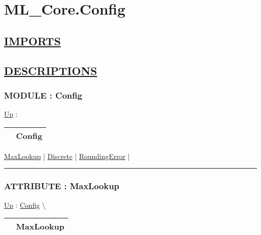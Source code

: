 \chapter*{ML\_Core.Config}
\hypertarget{ecldoc:toc:ML_Core.Config}{}

\section*{\underline{IMPORTS}}

\section*{\underline{DESCRIPTIONS}}
\subsection*{MODULE : Config}
\hypertarget{ecldoc:ML_Core.Config}{}
\hyperlink{ecldoc:toc:ML_Core}{Up} :

{\renewcommand{\arraystretch}{1.5}
\begin{tabularx}{\textwidth}{|>{\raggedright\arraybackslash}l|X|}
\hline
\hspace{0pt} & Config \\
\hline
\end{tabularx}
}

\par


\hyperlink{ecldoc:ml_core.config.maxlookup}{MaxLookup}  |
\hyperlink{ecldoc:ml_core.config.discrete}{Discrete}  |
\hyperlink{ecldoc:ml_core.config.roundingerror}{RoundingError}  |

\rule{\linewidth}{0.5pt}

\subsection*{ATTRIBUTE : MaxLookup}
\hypertarget{ecldoc:ml_core.config.maxlookup}{}
\hyperlink{ecldoc:ML_Core.Config}{Up} :
\hspace{0pt} \hyperlink{ecldoc:ML_Core.Config}{Config} \textbackslash 

{\renewcommand{\arraystretch}{1.5}
\begin{tabularx}{\textwidth}{|>{\raggedright\arraybackslash}l|X|}
\hline
\hspace{0pt} & MaxLookup \\
\hline
\end{tabularx}
}

\par


